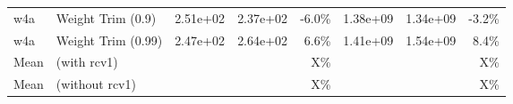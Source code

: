 \begin{table*}[ht]
\begin{center}
\begin{small}
\begin{sc}
\begin{tabular}{llccrccr}
w4a & Weight Trim (0.9) & 2.51e+02 & 2.37e+02 & -6.0\% & 1.38e+09 & 1.34e+09 & -3.2\% \\
w4a & Weight Trim (0.99) & 2.47e+02 & 2.64e+02 & 6.6\% & 1.41e+09 & 1.54e+09 & 8.4\% \\
\midrule
Mean & (with rcv1)  & &  & X\% & & & X\% \\
\midrule
Mean & (without rcv1)  & &  & X\% & & & X\% \\
\bottomrule
\end{tabular}
\end{sc}
\end{small}
\end{center}
\vskip -0.1in
\end{table*}

